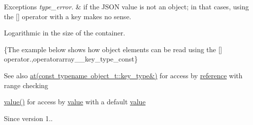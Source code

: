 \begin{DoxyExceptions}{Exceptions}
{\em type\+\_\+error.} & if the J\+S\+ON value is not an object; in that cases, using the \mbox{[}\mbox{]} operator with a key makes no sense.\\
\hline
\end{DoxyExceptions}
Logarithmic in the size of the container.

\{The example below shows how object elements can be read using the {\ttfamily \mbox{[}\mbox{]}} operator.,operatorarray\+\_\+\+\_\+key\+\_\+type\+\_\+const\}

\begin{DoxySeeAlso}{See also}
\mbox{\hyperlink{classnlohmann_1_1basic__json_a93403e803947b86f4da2d1fb3345cf2c}{at(const typename object\+\_\+t\+::key\+\_\+type\&)}} for access by \mbox{\hyperlink{classnlohmann_1_1basic__json_ac6a5eddd156c776ac75ff54cfe54a5bc}{reference}} with range checking 

\mbox{\hyperlink{classnlohmann_1_1basic__json_adcf8ca5079f5db993820bf50036bf45d}{value()}} for access by \mbox{\hyperlink{classnlohmann_1_1basic__json_adcf8ca5079f5db993820bf50036bf45d}{value}} with a default \mbox{\hyperlink{classnlohmann_1_1basic__json_adcf8ca5079f5db993820bf50036bf45d}{value}}
\end{DoxySeeAlso}
\begin{DoxySince}{Since}
version 1.. 
\end{DoxySince}
\mbox{\label{classnlohmann_1_1basic__json_abb8eaa633584b5aff9c8fcd242f25ca8}} 

